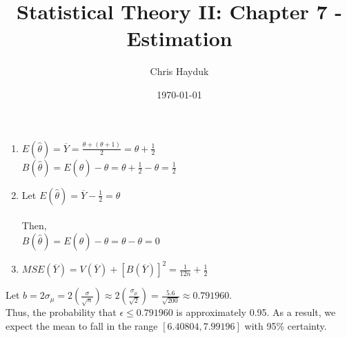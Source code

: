\documentclass[12pt]{article}
\newenvironment{problem}[2][Problem]{\begin{trivlist}
\item[\hskip \labelsep {\bfseries #1}\hskip \labelsep {\bfseries #2.}]}{\end{trivlist}}
\begin{document}
\title{Statistical Theory II: Chapter 7 - Estimation}

\author{Chris Hayduk}
\date{\today}

\maketitle

\begin{problem}{8.12}
\end{problem}

\begin{enumerate}[label=\alph*)]
	\item $E(\hat{\theta}) = \overline{Y} = \frac{\theta + (\theta+1)}{2} = \theta + \frac{1}{2}$\\
		  $B(\hat{\theta}) = E(\hat{\theta}) - \theta = \theta + \frac{1}{2} - \theta = \frac{1}{2}$
	\item Let $E(\hat{\theta}) = \overline{Y} - \frac{1}{2} = \theta$\\
		  \\
		  Then,\\
		  $B(\hat{\theta}) = E(\hat{\theta}) - \theta = \theta - \theta = 0$
	\item $MSE(\overline{Y}) = V(\overline{Y}) + [B(\overline{Y})]^2 = \frac{1}{12n} + \frac{1}{2}$
\end{enumerate}

\begin{problem}{8.22}
\end{problem}

Let $b = 2\sigma_{\mu} = 2(\frac{\sigma}{\sqrt{n}}) \approx 2(\frac{\sigma_{\mu}}{\sqrt{2}}) = \frac{5.6}{\sqrt{200}} \approx 0.791960.$\\

Thus, the probability that $\epsilon \leq 0.791960$ is approximately 0.95. As a result, we expect the mean to fall in the range $[6.40804, 7.99196]$ with 95\% certainty.

\begin{problem}{8.46}
\end{problem}
\end{document}
